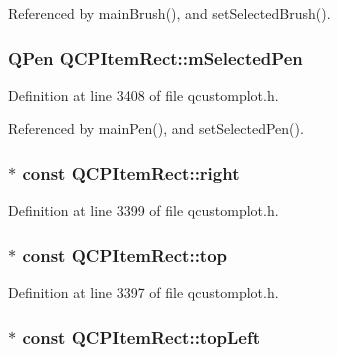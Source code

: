Referenced by main\+Brush(), and set\+Selected\+Brush().

\hypertarget{class_q_c_p_item_rect_a73cc0bee61de3c67221ec8c7a76a29ed}{}
\subsubsection[{m\+Selected\+Pen}]{\setlength{\rightskip}{0pt plus 5cm}Q\+Pen Q\+C\+P\+Item\+Rect\+::m\+Selected\+Pen\hspace{0.3cm}{\ttfamily [protected]}}\label{class_q_c_p_item_rect_a73cc0bee61de3c67221ec8c7a76a29ed}


Definition at line 3408 of file qcustomplot.\+h.



Referenced by main\+Pen(), and set\+Selected\+Pen().

\hypertarget{class_q_c_p_item_rect_a7979c1915f61ad2609a9cc179c2e445e}{}
\subsubsection[{right}]{$\ast$ const Q\+C\+P\+Item\+Rect\+::right}\label{class_q_c_p_item_rect_a7979c1915f61ad2609a9cc179c2e445e}


Definition at line 3399 of file qcustomplot.\+h.

\hypertarget{class_q_c_p_item_rect_a96e50db552fb297d6fb62614676217bc}{}
\subsubsection[{top}]{$\ast$ const Q\+C\+P\+Item\+Rect\+::top}\label{class_q_c_p_item_rect_a96e50db552fb297d6fb62614676217bc}


Definition at line 3397 of file qcustomplot.\+h.

\hypertarget{class_q_c_p_item_rect_aa70feeef173489b03c3fbe906a5023c4}{}
\subsubsection[{top\+Left}]{$\ast$ const Q\+C\+P\+Item\+Rect\+::top\+Left}\label{class_q_c_p_item_rect_aa70feeef173489b03c3fbe906a5023c4}


